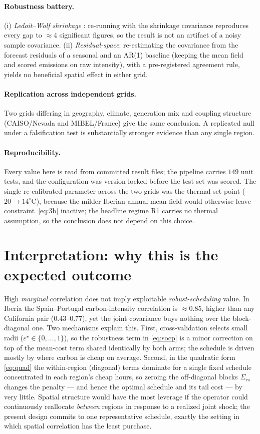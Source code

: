 \documentclass[11pt]{article}
\newcommand{\degC}{^{\circ}\mathrm{C}}
\begin{document}
\paragraph{Robustness battery.} (i) \emph{Ledoit--Wolf shrinkage} \cite{ledoit2004}: re-running with the
shrinkage covariance reproduces every gap to $\approx 4$ significant figures, so the result is not an
artifact of a noisy sample covariance. (ii) \emph{Residual-space}: re-estimating the covariance from the
forecast residuals of a seasonal and an AR(1) baseline (keeping the mean field and scored emissions on
raw intensity), with a pre-registered agreement rule, yields no beneficial spatial effect in either
grid.

\paragraph{Replication across independent grids.} Two grids differing in geography, climate, generation
mix and coupling structure (CAISO/Nevada and MIBEL/France) give the same conclusion. A replicated null
under a falsification test is substantially stronger evidence than any single region.

\paragraph{Reproducibility.} Every value here is read from committed result files; the pipeline carries
$149$ unit tests, and the configuration was version-locked before the test set was scored. The single
re-calibrated parameter across the two grids was the thermal set-point ($20\to 14\degC$), because the
milder Iberian annual-mean field would otherwise leave constraint~\eqref{eq:3b} inactive; the headline
regime R1 carries no thermal assumption, so the conclusion does not depend on this choice.

\section{Interpretation: why this is the expected outcome}
High \emph{marginal} correlation does not imply exploitable \emph{robust-scheduling} value. In Iberia the
Spain--Portugal carbon-intensity correlation is $\approx 0.85$, higher than any California pair
($0.43$--$0.77$), yet the joint covariance buys nothing over the block-diagonal one. Two mechanisms
explain this. First, cross-validation selects small radii ($\varepsilon^\star\in\{0,\dots,1\}$), so the
robustness term in \eqref{eq:socp} is a minor correction on top of the mean-cost term shared identically
by both arms; the schedule is driven mostly by where carbon is cheap on average. Second, in the
quadratic form \eqref{eq:quad} the within-region (diagonal) terms dominate for a single fixed schedule
concentrated in each region's cheap hours, so zeroing the off-diagonal blocks $\Sigma_{rs}$ changes the
penalty --- and hence the optimal schedule and its tail cost --- by very little. Spatial structure would
have the most leverage if the operator could continuously reallocate \emph{between} regions in response
to a realized joint shock; the present design commits to one representative schedule, exactly the
setting in which spatial correlation has the least purchase.
\end{document}
